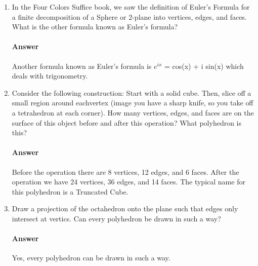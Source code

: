 \documentclass{article}
\begin{document}
\begin{enumerate}

    \item In the Four Colors Suffice book, we saw the definition of Euler's
        Formula for a finite decomposition of a Sphere or 2-plane into vertices,
        edges, and faces.  What is the other formula known as Euler's formula?

        \paragraph{Answer}

        {Another formula known as Euler's formula is $ e^{ix}$ = cos(x) + i sin(x) which deals with trigonometry.}

    \item  Consider the following construction: Start with a solid cube.  Then, slice
        off a small region around eachvertex (image you have a sharp knife, so you take
        off a tetrahedron at each corner).  How many vertices, edges, and faces are on
        the surface of this object before and after this operation? What polyhedron is this?

        \paragraph{Answer}

        {Before the operation there are 8 vertices, 12 edges,  and 6 faces. After the operation we have  24 vertices, 36 edges, and 14 faces. The typical name for this polyhedron is a Truncated Cube. }


    \item Draw a projection of the octahedron onto the plane such that edges only
        intersect at vertics.  Can every polyhedron be drawn in such a way?

        \paragraph{Answer}

       {Yes, every polyhedron can be drawn in such a way.}


\end{enumerate}

\end{document}
